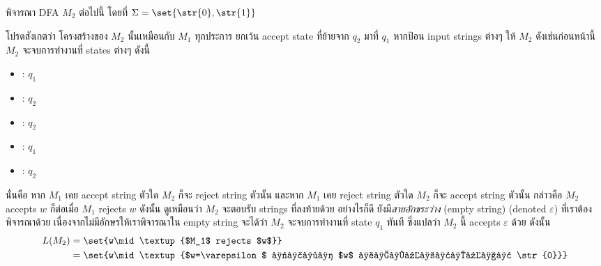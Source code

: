 \begin{example}\label{ex:dfa-nil-or-0end}
พิจารณา DFA $M_2$ ต่อไปนี้ โดยที่ $\Sigma=\set{\str{0},\str{1}}$
\begin{center}
\end{center}
โปรดสังเกตว่า โครงสร้างของ $M_2$ นั้นเหมือนกับ $M_1$ ทุกประการ ยกเว้น accept state ที่ย้ายจาก $q_2$ มาที่ $q_1$ \enskip หากป้อน input strings ต่างๆ ให้ $M_2$ ดังเช่นก่อนหน้านี้ $M_2$ จะจบการทำงานที่ states ต่างๆ ดังนี้
\begin{itemize}
\item {}: $q_1$ \yea
\item {}: $q_2$ \nay
\item {}: $q_2$ \nay
\item {}: $q_1$ \yea
\item {}: $q_2$ \nay
\end{itemize}
นั่นคือ หาก $M_1$ เคย accept string ตัวใด $M_2$ ก็จะ reject string ตัวนั้น และหาก $M_1$ เคย reject string ตัวใด $M_2$ ก็จะ accept string ตัวนั้น กล่าวคือ $M_2$ accepts $w$ ก็ต่อเมื่อ $M_1$ rejects $w$ \enskip ดังนั้น ดูเหมือนว่า $M_2$ จะตอบรับ strings ที่ลงท้ายด้วย  \enskip อย่างไรก็ดี ยังมี\emph{สายอักขระว่าง} (empty string) (denoted $\varepsilon$) ที่เราต้องพิจารณาด้วย \enskip เนื่องจากไม่มีอักษรให้เราพิจารณาใน empty string จะได้ว่า $M_2$ จะจบการทำงานที่ state $q_1$ ทันที ซึ่งแปลว่า $M_2$ นี้ accepts $\varepsilon$ ด้วย \enskip ดังนั้น
\begin{align*}
L(M_2)
&=\set{w\mid\textup{$M_1$ rejects $w$}} \\
&=\set{w\mid\textup{$w=\varepsilon$ หรือ $w$ ลงท้ายด้วย \str{0}}}
\end{align*}
\end{example}
